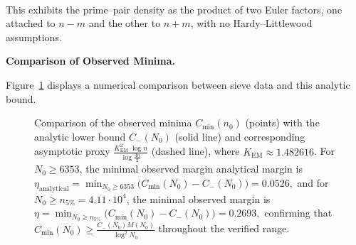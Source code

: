 \documentclass[11pt]{article}
\makeatletter
\theoremstyle{inline}
\theoremstyle{break}
\renewenvironment{proof}[1][\proofname]{%
  \par\pushQED{\qed}%
  \normalfont \topsep6\p@\@plus6\p@\relax
  \trivlist
  \item[\hskip\labelsep
        \itshape
    #1\@addpunct{.}]\mbox{}\\  %
}{%
  \popQED\endtrivlist\@endpefalse
}
\theoremstyle{break}
\theoremstyle{break}
\theoremstyle{break}
\theoremstyle{break}
\theoremstyle{break}
\theoremstyle{break}
\theoremstyle{inline}
\newcommand{\xMertens}{6353} %
\newcommand{\xNzeroStat}{71633} %
\newcommand{\xEtaStat}{0.2693} %
\newcommand{\xMinGlobal}{7219}       %
\newcommand{\xDeltaGlobal}{0.0526}   %
\newcommand{\tana}{{\scriptscriptstyle\mathrm{analytical}}}
\newcommand{\Cmeas}{C}              %
\newcommand{\Cminus}{\mathring{C}_{-}}   %
\newcommand{\CminusProduct}{C_{-}}
\newcommand{\CminusAsymp}{C_{-}^{\mathrm{asymp}}}
\newcommand{\Kem}{K_{\mathrm{EM}}}              %
\makeatother
\begin{document}
\begin{proof}
This exhibits the prime--pair density as the product of two Euler factors,
one attached to \(n-m\) and the other to \(n+m\), with no Hardy--Littlewood
assumptions.\cite{HardyLittlewood1923,Vaughan1997} 

\noindent\textbf{Comparison of Observed Minima.}

Figure~\ref{fig:lower-analytic-bound-comparison} displays
a numerical comparison between sieve data and this analytic bound.

\cpsdata

\begin{figure}[H]
\centering
{}
\caption{Comparison of the observed minima \( \Cmeas_{\min}(n_0) \) (points) with the analytic lower bound \( \CminusProduct(N_0) \) (solid line)
and corresponding asymptotic proxy \( \tfrac{\Kem^2\;\log{n}}{\log{\frac{3n}{2}}} \) (dashed line), where \( \Kem \approx 1.482616 \).
For \( N_0 \ge \xMertens \), the minimal observed margin analytical margin is
\(\displaystyle 
\eta_{\tana} = \min_{N_0 \ge \xMertens} \bigl( \Cmeas_{\min}(N_0) - \CminusProduct(N_0) ) = \xDeltaGlobal,
\)
and for \( N_0 \ge n_{5\%} = 4.11 \cdot 10^{4} \), the minimal observed margin is
\(\displaystyle 
\eta = \min_{N_0 \ge n_{5\%}} \bigl( \Cmeas_{\min}(N_0) - \CminusProduct(N_0) ) = \xEtaStat,
\)
confirming that \( \Cmeas_{\min}(N_0) \ge \tfrac{\CminusProduct(N_0) M(N_0)}{\log^2{N_0}} \) throughout the verified range.}
\label{fig:lower-analytic-bound-comparison}
\end{figure}



\end{proof}
\end{document}
